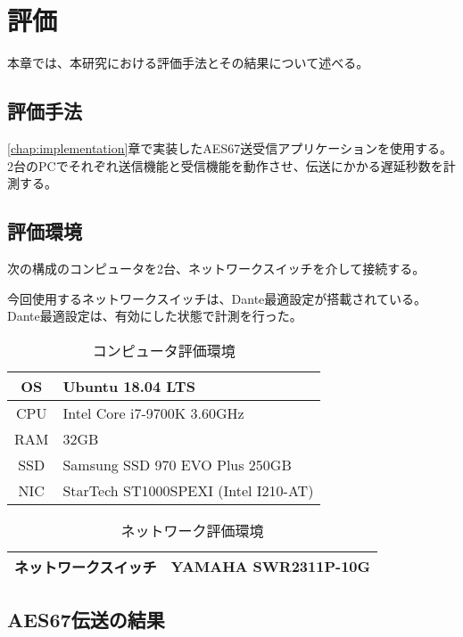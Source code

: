 \chapter{評価}
\label{chap:evaluation}

本章では、本研究における評価手法とその結果について述べる。

\section{評価手法}

\ref{chap:implementation}章で実装したAES67送受信アプリケーションを使用する。2台のPCでそれぞれ送信機能と受信機能を動作させ、伝送にかかる遅延秒数を計測する。

\section{評価環境}

次の構成のコンピュータを2台、ネットワークスイッチを介して接続する。

今回使用するネットワークスイッチは、Dante最適設定が搭載されている。Dante最適設定は、有効にした状態で計測を行った。

\begin{table}[htb]
  \label{tab:evaluation_computer}
  \caption{コンピュータ評価環境}
  \centering
  \begin{tabular}{c|l} \hline
    OS & Ubuntu 18.04 LTS \\ \hline
    CPU & Intel Core i7-9700K 3.60GHz \\ \hline
    RAM & 32GB \\ \hline
    SSD & Samsung SSD 970 EVO Plus 250GB \\ \hline
    NIC & StarTech ST1000SPEXI (Intel I210-AT) \\ \hline
  \end{tabular}
\end{table}

\begin{table}[htb]
  \label{tab:evaluation_network}
  \caption{ネットワーク評価環境}
  \centering
  \begin{tabular}{c|l} \hline
    ネットワークスイッチ & YAMAHA SWR2311P-10G \\ \hline
  \end{tabular}
\end{table}

\section{AES67伝送の結果}


